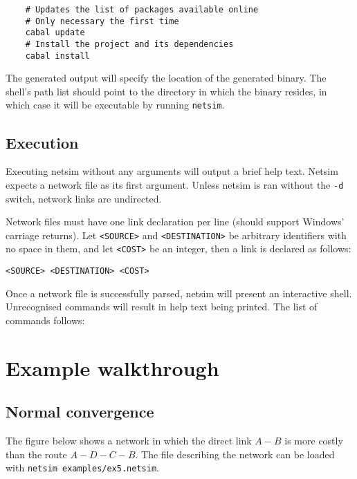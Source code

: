 \documentclass{scrartcl}
\begin{document}
\begin{verbatim}
    # Updates the list of packages available online
    # Only necessary the first time
    cabal update
    # Install the project and its dependencies
    cabal install
\end{verbatim}

The generated output will specify the location of the generated binary. The
shell's path list should point to the directory in which the binary resides, in
which case it will be executable by running \texttt{netsim}.

\subsection{Execution}

Executing netsim without any arguments will output a brief help text. Netsim
expects a network file as its first argument. Unless netsim is ran without the
\texttt{-d} switch, network links are undirected.

Network files must have one link declaration per line (should support Windows'
carriage returns). Let \texttt{<SOURCE>} and \texttt{<DESTINATION>} be arbitrary
identifiers with no space in them, and let \texttt{<COST>} be an integer, then a
link is declared as follows:

\begin{verbatim}
<SOURCE> <DESTINATION> <COST>
\end{verbatim}

Once a network file is successfully parsed, netsim will present an interactive
shell. Unrecognised commands will result in help text being printed. The list of
commands follows:

\section{Example walkthrough}

\subsection{Normal convergence}

The figure below shows a network in which the direct link $A - B$ is more
costly than the route $A - D - C - B$. The file describing the network can be
loaded with \texttt{netsim examples/ex5.netsim}.

\begin{figure}[h!]
\centering
{}
\end{figure}
\end{document}

